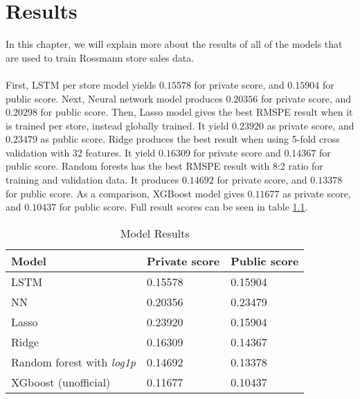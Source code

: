 \chapter{Results}
In this chapter, we will explain more about the results of all of the models that are used to train Rossmann store sales data. \\ \\
First, LSTM per store model yields $0.15578$ for private score, and $0.15904$ for public score. Next, Neural network model produces $0.20356$ for private score, and $0.20298$ for public score. Then, Lasso model gives the best RMSPE result when it is trained per store, instead globally trained. It yield $0.23920$ as private score, and $0.23479$ as public score. Ridge produces the best result when using 5-fold cross validation with 32 features. It yield $0.16309$ for private score and $0.14367$ for public score. Random forests has the best RMSPE result with 8:2 ratio for training and validation data. It produces $0.14692$ for private score, and $0.13378$ for public score. As a comparison, XGBoost model gives $0.11677$ as private score, and $0.10437$ for public score. Full result scores can be seen in table \ref{tab:result}.

\begin{table}[h]
	\centering
	\caption{Model Results}
	\label{tab:result}
	\begin{tabular}{|m{}|m{}|m{}|}
		\hline
		Model & Private score & Public score \\ \hline
		LSTM & 0.15578 & 0.15904 \\ \hline
		NN & 0.20356 & 0.23479 \\ \hline
		Lasso & 0.23920 & 0.15904 \\ \hline
		Ridge & 0.16309 & 0.14367 \\ \hline
		Random forest with \textit{log1p} & 0.14692 & 0.13378 \\ \hline
		XGboost (unofficial) & 0.11677 & 0.10437 \\ \hline
	\end{tabular}
\end{table}